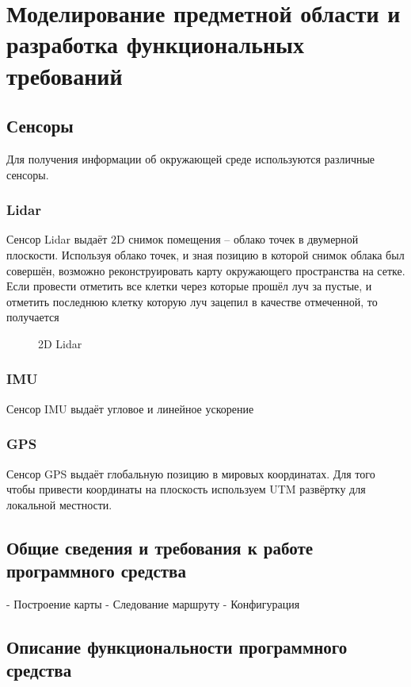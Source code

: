 \section{Моделирование предметной области и разработка функциональных
требований}

\subsection{Сенсоры}

Для получения информации об окружающей среде используются различные сенсоры.

\subsubsection{Lidar}
Сенсор Lidar выдаёт 2D снимок помещения -- облако точек в двумерной плоскости.
Используя облако точек, и зная позицию в которой снимок облака был совершён,
возможно реконструировать карту окружающего пространства на сетке. Если провести
отметить все клетки через которые прошёл луч за пустые, и отметить последнюю
клетку которую луч зацепил в качестве отмеченной, то получается 

\begin{figure}[h]
\centering
\caption{2D Lidar}
\end{figure}

\subsubsection{IMU}
Сенсор IMU выдаёт угловое и линейное ускорение

\subsubsection{GPS}
Сенсор GPS выдаёт глобальную позицию в мировых координатах. Для того чтобы
привести координаты на плоскость используем UTM развёртку для локальной
местности.

\subsection{Общие сведения и требования к работе программного средства}
- Построение карты
- Следование маршруту
- Конфигурация 

\subsection{Описание функциональности программного средства}

